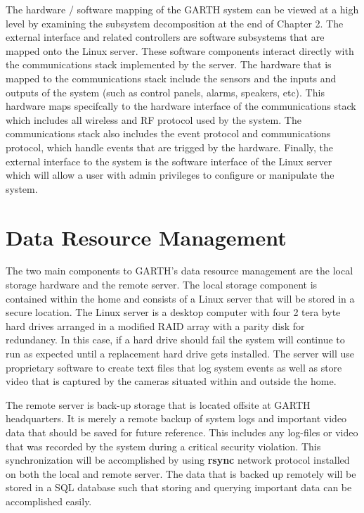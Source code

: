 \documentclass{report}
\begin{document}
The hardware / software mapping of the GARTH system can be viewed at a high
level by examining the subsystem decomposition at the end of Chapter 2. The
external interface and related controllers are software subsystems that are
mapped onto the Linux server. These software components interact directly with
the communications stack implemented by the server. The hardware that is mapped
to the communications stack include the sensors and the inputs and outputs of
the system (such as control panels, alarms, speakers, etc). This hardware maps
specifcally to the hardware interface of the communications stack which
includes all wireless and RF protocol used by the system. The communications
stack also includes the event protocol and communications protocol, which
handle events that are trigged by the hardware. Finally, the external interface
to the system is the software interface of the Linux server which will allow a
user with admin privileges to configure or manipulate the system.

\section{Data Resource Management}

The two main components to GARTH's data resource management are the local
storage hardware and the remote server. The local storage component is
contained within the home and consists of a Linux server that will be stored in
a secure location. The Linux server is a desktop computer with four 2 tera byte
hard drives arranged in a modified RAID array with a parity disk for
redundancy. In this case, if a hard drive should fail the system will continue
to run as expected until a replacement hard drive gets installed. The server
will use proprietary software  to create text files that log system events as
well as store video that is captured by the cameras situated within and outside
the home.
 
The remote server is back-up storage that is located offsite at GARTH
headquarters. It is merely a remote backup of system logs and important video
data that should be saved for future reference. This includes any log-files or
video that was recorded by the system during a critical security violation. This
synchronization will be accomplished by using \textbf{rsync} network protocol
installed on both the local and remote server. The data that is backed up
remotely will be stored in a SQL database such that storing and querying
important data can be accomplished easily.
\end{document}
